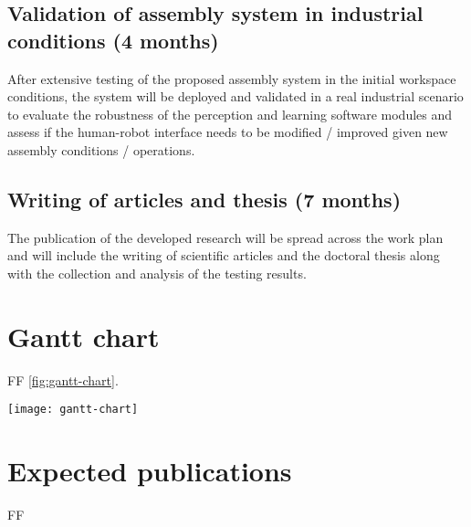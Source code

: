 \subsection{Validation of assembly system in industrial conditions (4 months)}

After extensive testing of the proposed assembly system in the initial workspace conditions, the system will be deployed and validated in a real industrial scenario to evaluate the robustness of the perception and learning software modules and assess if the human-robot interface needs to be modified / improved given new assembly conditions / operations.


\subsection{Writing of articles and thesis (7 months)}

The publication of the developed research will be spread across the work plan and will include the writing of scientific articles and the doctoral thesis along with the collection and analysis of the testing results.



\section{Gantt chart}

FF \cref{fig:gantt-chart}.

\begin{sidewaysfigure}
	\centering
	\texttt{[image: gantt-chart]}
	\caption{Gantt chart with main tasks and milestones}
	\label{fig:gantt-chart}
\end{sidewaysfigure}



\section{Expected publications}

FF


